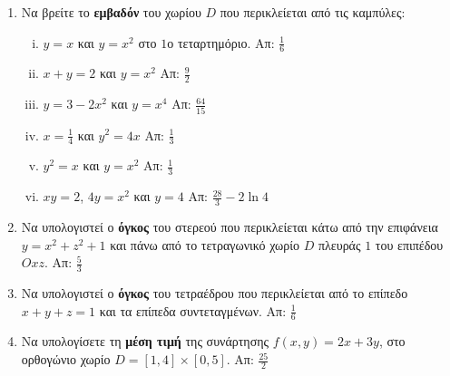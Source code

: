 \begin{enumerate}
  \item Να βρείτε το \textbf{εμβαδόν} του χωρίου $D$ που περικλείεται από τις καμπύλες: 
    \begin{enumerate}[i)]
      \item $y=x$ και $y=x^2$ στο $1$ο τεταρτημόριο. \hfill Απ: $\frac{1}{6}$
      \item $x+y=2$ και $y=x^2$ \hfill Απ: $\frac{9}{2}$
      \item $y=3-2x^2$ και $y=x^4$ \hfill Απ: $\frac{64}{15}$
      \item $x=\frac{1}{4}$ και $y^2=4x$ \hfill Απ: $\frac{1}{3}$ %
      \item $y^2=x$ και $y=x^2$ \hfill Απ: $\frac{1}{3}$ %
      \item $xy=2$, $4y=x^2$ και $y=4$ \hfill Απ: $\frac{28}{3}-2\ln 4$ 
    \end{enumerate}

  \item Να υπολογιστεί ο \textbf{όγκος} του στερεού που περικλείεται κάτω από 
    την επιφάνεια $y=x^2+z^2+1$ και πάνω από το τετραγωνικό χωρίο $D$ πλευράς $1$ 
    του επιπέδου $Oxz$.
    \hfill Απ: $\frac{5}{3}$ %

  \item Να υπολογιστεί ο \textbf{όγκος} του τετραέδρου που περικλείεται από το 
    επίπεδο $x+y+z=1$ και τα επίπεδα συντεταγμένων.  
    \hfill Απ: $\frac{1}{6}$ %


  \item Να υπολογίσετε τη \textbf{μέση τιμή} της συνάρτησης $ f(x,y)=2x+3y $, στο 
    ορθογώνιο χωρίο $D= [1,4] \times [0,5]$.
    \hfill Απ: $ \frac{25}{2} $ 
\end{enumerate}

\pagebreak

\begin{center}
  \minibox{\large\bf \textcolor{Col1}{Υποδείξεις}}
\end{center}

\vspace{\baselineskip}

